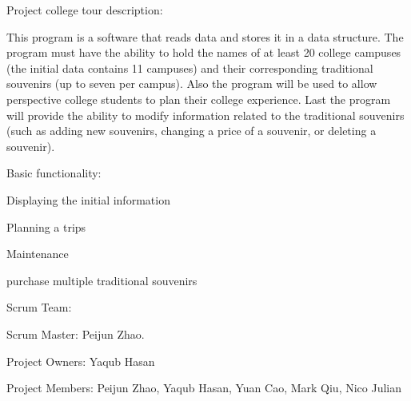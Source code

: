 Project college tour description\+: \begin{DoxyVerb}This program is a software that reads data and stores it in a data structure. 
The program must have the ability to hold the names of at least 20 college campuses 
(the initial data contains 11 campuses) and their corresponding traditional 
souvenirs (up to seven per campus). Also the program will be used to allow perspective
college students to plan their college experience. Last the program will provide the
ability to modify information related to the traditional souvenirs (such as adding
new souvenirs, changing a price of a souvenir, or deleting a souvenir).
\end{DoxyVerb}
 Basic functionality\+: \begin{DoxyVerb}Displaying the initial information 

Planning a trips

Maintenance

purchase multiple traditional souvenirs
\end{DoxyVerb}
 Scrum Team\+: \begin{DoxyVerb}Scrum Master: Peijun Zhao.

Project Owners: Yaqub Hasan

Project Members: Peijun Zhao, Yaqub Hasan, Yuan Cao, Mark Qiu, Nico Julian
\end{DoxyVerb}
 
